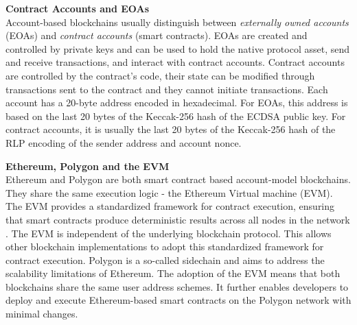 \documentclass[12pt,a4paper,titlepage,oneside,english]{article}
\begin{document}
\textbf{Contract Accounts and EOAs}\\
Account-based blockchains usually distinguish between \textit{externally owned accounts} (EOAs) and \textit{contract accounts} (smart contracts). EOAs are created and controlled by private keys and can be used to hold the native protocol asset, send and receive transactions, and interact with contract accounts. Contract accounts are controlled by the contract's code, their state can be modified through transactions sent to the contract and they cannot initiate transactions. \citep{buterin2014ethereum} \newline Each account has a 20-byte address encoded in hexadecimal. For EOAs, this address is based on the last 20 bytes of the Keccak-256 hash of the ECDSA public key. For contract accounts, it is usually the last 20 bytes of the Keccak-256 hash of the RLP encoding of the sender address and account nonce. \citep{GW:14}

\textbf{Ethereum, Polygon and the EVM}\\
Ethereum and Polygon are both smart contract based account-model blockchains. They share the same execution logic - the Ethereum Virtual machine (EVM).
The EVM provides a standardized framework for contract execution, ensuring that smart contracts produce deterministic results across all nodes in the network \citep{GW:14}. The EVM is independent of the underlying blockchain protocol. This allows other blockchain implementations to adopt this standardized framework for contract execution.\newline
Polygon is a so-called sidechain and aims to address the scalability limitations of Ethereum. The adoption of the EVM means that both blockchains share the same user address schemes. It further enables developers to deploy and execute Ethereum-based smart contracts on the Polygon network with minimal changes. \citep{matic_whitepaper}
\end{document}
